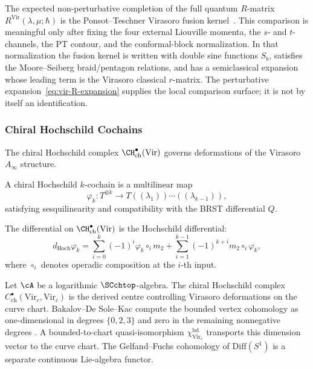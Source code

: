 \begin{remark}
The expected non-perturbative completion of the full quantum
$R$-matrix $R^{\text{Vir}}(\lambda,\mu;\hbar)$ is the
Ponsot--Teschner Virasoro fusion kernel~\cite{PT01}. This comparison
is meaningful only after fixing the four external Liouville momenta,
the $s$- and $t$-channels, the PT contour, and the conformal-block
normalization. In that normalization the fusion kernel is written with
double sine functions $S_b$, satisfies the Moore--Seiberg
braid/pentagon relations, and has a semiclassical expansion whose
leading term is the Virasoro classical $r$-matrix. The perturbative
expansion~\eqref{eq:vir-R-expansion} supplies the local comparison
surface; it is not by itself an identification.
\end{remark}

\subsubsection{Chiral Hochschild Cochains}

The chiral Hochschild complex $\CH^\bullet_{\text{ch}}(\text{Vir})$ governs deformations of the Virasoro $A_\infty$ structure.

\begin{definition}
A chiral Hochschild $k$-cochain is a multilinear map
\begin{equation}
\varphi_k: T^{\otimes k} \to T((\lambda_1))\cdots((\lambda_{k-1})),
\end{equation}
satisfying sesquilinearity and compatibility with the BRST differential $Q$.
\end{definition}

The differential on $\CH^\bullet_{\text{ch}}(\text{Vir})$ is the Hochschild differential:
\begin{equation}
d_{\text{Hoch}} \varphi_k = \sum_{i=0}^k (-1)^i \varphi_k \circ_i m_2 + \sum_{i=1}^{k-1} (-1)^{k+i} m_2 \circ_i \varphi_k,
\end{equation}
where $\circ_i$ denotes operadic composition at the $i$-th input.

\begin{proposition}
Let\/ $\cA$ be a logarithmic\/ $\SCchtop$-algebra.
The chiral Hochschild complex $C^\bullet_{\mathrm{ch}}(\mathrm{Vir}_c,
\mathrm{Vir}_c)$ is the derived centre controlling Virasoro
deformations on the curve chart.  Bakalov--De Sole--Kac compute the
bounded vertex cohomology as one-dimensional in degrees
$\{0,2,3\}$ and zero in the remaining nonnegative degrees
\cite[Theorem~7.2]{BDSK21}.  A bounded-to-chart quasi-isomorphism
$\chi^{\mathrm{bd}}_{\mathrm{Vir}_c}$ transports this dimension vector
to the curve chart.  The Gelfand--Fuchs cohomology of
$\mathrm{Diff}(S^1)$ is a separate continuous Lie-algebra functor.
\end{proposition}

